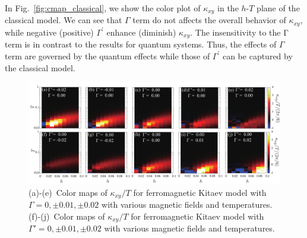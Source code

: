 \documentclass[twocolumn,superscriptaddress,showpacs, longbibliography, aps, prb]{revtex4-2}
\newcommand{\red}[1]{\textcolor{red}{#1}}
\newcommand{\blue}[1]{\textcolor{blue}{#1}}
\begin{document}
In Fig.~\ref{fig:cmap_classical}, we show the color plot of $\kappa_{xy}$ in the $h$-$T$ plane of the classical model. 
We can see that $\Gamma$ term do not affects the overall behavior of $\kappa_{xy}$, 
while negative (positive) $\Gamma^{\prime}$ enhance (diminish) $\kappa_{xy}$.
The insensitivity to the Γ term is in contrast to the results for quantum systems.
Thus, the effects of $\Gamma$ term are governed by the
quantum effects while those of $\Gamma^{\prime}$ can be captured by the
classical model. 


\begin{figure}[htb]
  \begin{center}
    \includegraphics[width=\linewidth]{Figs/color_map_all.pdf}
  \end{center}
  \caption{(a)-(e)~Color maps of $\kappa_{xy}/T$ for ferromagnetic Kitaev model with $\Gamma = 0, \pm 0.01, \pm 0.02$ with various magnetic fields and temperatures.
  (f)-(j)~Color maps of $\kappa_{xy}/T$ for ferromagnetic Kitaev model with $\Gamma' = 0, \pm 0.01, \pm 0.02$ with various magnetic fields and temperatures.}
  \label{fig:color_map_all}
\end{figure}

\end{document}
